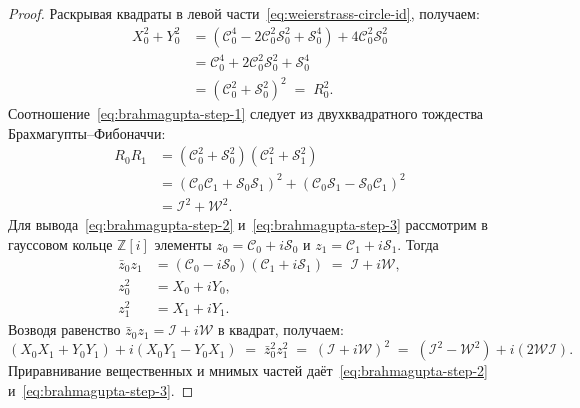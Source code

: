 \documentclass[11pt,a4paper]{article}
\theoremstyle{plain}
\theoremstyle{definition}
\begin{document}
\begin{proof}
Раскрывая квадраты в левой части~\eqref{eq:weierstrass-circle-id}, получаем:
\begin{align*}
  X_0^2 + Y_0^2 &= (\mathcal{C}_0^4 - 2\mathcal{C}_0^2\mathcal{S}_0^2 + \mathcal{S}_0^4) + 4\mathcal{C}_0^2\mathcal{S}_0^2 \\
  &= \mathcal{C}_0^4 + 2\mathcal{C}_0^2\mathcal{S}_0^2 + \mathcal{S}_0^4 \\
  &= (\mathcal{C}_0^2 + \mathcal{S}_0^2)^2 \;=\; R_0^2.
\end{align*}
Соотношение~\eqref{eq:brahmagupta-step-1} следует из двухквадратного тождества Брахмагупты--Фибоначчи:
\begin{align*}
  R_0 R_1 &= (\mathcal{C}_0^2 + \mathcal{S}_0^2)(\mathcal{C}_1^2 + \mathcal{S}_1^2) \\
  &= (\mathcal{C}_0\mathcal{C}_1 + \mathcal{S}_0\mathcal{S}_1)^2 + (\mathcal{C}_0\mathcal{S}_1 - \mathcal{S}_0\mathcal{C}_1)^2 \\
  &= \mathcal{I}^2 + \mathcal{W}^2.
\end{align*}
Для вывода~\eqref{eq:brahmagupta-step-2} и~\eqref{eq:brahmagupta-step-3} рассмотрим в гауссовом кольце $\mathbb{Z}[i]$ элементы $z_0 = \mathcal{C}_0 + i\mathcal{S}_0$ и $z_1 = \mathcal{C}_1 + i\mathcal{S}_1$. Тогда
\begin{align*}
  \bar{z}_0 z_1 &= (\mathcal{C}_0 - i\mathcal{S}_0)(\mathcal{C}_1 + i\mathcal{S}_1) \;=\; \mathcal{I} + i\mathcal{W}, \\
  z_0^2 &= X_0 + iY_0, \\
  z_1^2 &= X_1 + iY_1.
\end{align*}
Возводя равенство $\bar{z}_0 z_1 = \mathcal{I} + i\mathcal{W}$ в квадрат, получаем:
\begin{equation*}
  (X_0 X_1 + Y_0 Y_1) + i(X_0 Y_1 - Y_0 X_1) \;=\; \bar{z}_0^2 z_1^2 \;=\; (\mathcal{I} + i\mathcal{W})^2 \;=\; (\mathcal{I}^2 - \mathcal{W}^2) + i(2\mathcal{W}\mathcal{I}).
\end{equation*}
Приравнивание вещественных и мнимых частей даёт~\eqref{eq:brahmagupta-step-2} и~\eqref{eq:brahmagupta-step-3}.
\end{proof}
\end{document}
